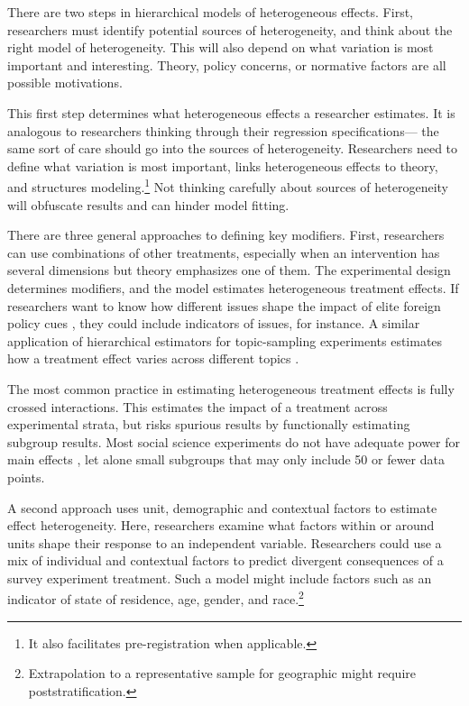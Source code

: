 \documentclass[12pt]{article}
\begin{document}
There are two steps in hierarchical models of heterogeneous effects. 
First, researchers must identify potential sources of heterogeneity, and think about the right model of heterogeneity.
This will also depend on what variation is most important and interesting. 
Theory, policy concerns, or normative factors are all possible motivations. 


This first step determines what heterogeneous effects a researcher estimates. 
It is analogous to researchers thinking through their regression specifications--- the same sort of care should go into the sources of heterogeneity. 
Researchers need to define what variation is most important, links heterogeneous effects to theory, and structures modeling.\footnote{It also facilitates pre-registration when applicable.}
Not thinking carefully about sources of heterogeneity will obfuscate results and can hinder model fitting.
   

There are three general approaches to defining key modifiers.  
First, researchers can use combinations of other treatments, especially when an intervention has several dimensions but theory emphasizes one of them. 
The experimental design determines modifiers, and the model estimates heterogeneous treatment effects.   
If researchers want to know how different issues shape the impact of elite foreign policy cues \citep{GuisingerSaunders2017}, they could include indicators of issues, for instance.
A similar application of hierarchical estimators for topic-sampling experiments estimates how a treatment effect varies across different topics \citep{CliffordRainey2023}. 


The most common practice in estimating heterogeneous treatment effects is fully crossed interactions.
This estimates the impact of a treatment across experimental strata, but risks spurious results by functionally estimating subgroup results.
Most social science experiments do not have adequate power for main effects \citep{ArelBundocketal2022}, let alone small subgroups that may only include 50 or fewer data points.


A second approach uses unit, demographic and contextual factors to estimate effect heterogeneity. 
Here, researchers examine what factors within or around units shape their response to an independent variable.
Researchers could use a mix of individual and contextual factors to predict divergent consequences of a survey experiment treatment. 
Such a model might include factors such as an indicator of state of residence, age, gender, and race.\footnote{Extrapolation to a representative sample for geographic might require poststratification.}
\end{document}
